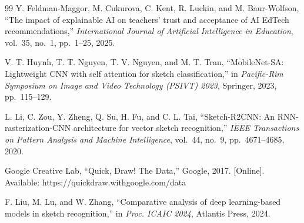 \documentclass[12pt,a4paper,oneside,openany]{report}
\begin{document}
\begin{thebibliography}{99}
Y. Feldman-Maggor, M. Cukurova, C. Kent, R. Luckin, and M. Baur-Wolfson, ``The impact of explainable AI on teachers' trust and acceptance of AI EdTech recommendations,'' \textit{International Journal of Artificial Intelligence in Education}, vol.~35, no.~1, pp.~1--25, 2025.

V. T. Huynh, T. T. Nguyen, T. V. Nguyen, and M. T. Tran, ``MobileNet-SA: Lightweight CNN with self attention for sketch classification,'' in \textit{Pacific-Rim Symposium on Image and Video Technology (PSIVT) 2023}, Springer, 2023, pp.~115--129.

L. Li, C. Zou, Y. Zheng, Q. Su, H. Fu, and C. L. Tai, ``Sketch-R2CNN: An RNN-rasterization-CNN architecture for vector sketch recognition,'' \textit{IEEE Transactions on Pattern Analysis and Machine Intelligence}, vol.~44, no.~9, pp.~4671--4685, 2020.

Google Creative Lab, ``Quick, Draw! The Data,'' Google, 2017. [Online]. Available: https://quickdraw.withgoogle.com/data

F. Liu, M. Lu, and W. Zhang, ``Comparative analysis of deep learning-based models in sketch recognition,'' in \textit{Proc. ICAIC 2024}, Atlantis Press, 2024.

\end{thebibliography}
\end{document}
